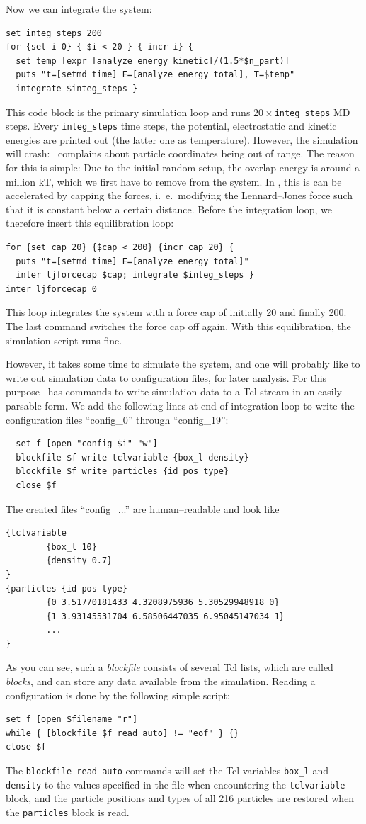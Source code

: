 Now we can integrate the system:
\begin{verbatim}
set integ_steps 200
for {set i 0} { $i < 20 } { incr i} {
  set temp [expr [analyze energy kinetic]/(1.5*$n_part)]
  puts "t=[setmd time] E=[analyze energy total], T=$temp"
  integrate $integ_steps }
\end{verbatim}
This code block is the primary simulation loop and runs
$20\times$\verb|integ_steps| MD steps. Every \verb|integ_steps| time steps, the
potential, electrostatic and kinetic energies are printed out (the latter one as
temperature). However, the simulation will crash: \es\ complains about particle
coordinates being out of range. The reason for this is simple: Due to the
initial random setup, the overlap energy is around a million kT, which we first
have to remove from the system. In \es, this is can be accelerated by capping
the forces, i.~e.\ modifying the Lennard--Jones force such that it is constant
below a certain distance. Before the integration loop, we therefore insert this
equilibration loop:
\begin{verbatim}
for {set cap 20} {$cap < 200} {incr cap 20} {
  puts "t=[setmd time] E=[analyze energy total]"
  inter ljforcecap $cap; integrate $integ_steps }
inter ljforcecap 0
\end{verbatim}
This loop integrates the system with a force cap of initially 20 and finally
200.  The last command switches the force cap off again. With this
equilibration, the simulation script runs fine.

However, it takes some time to simulate the system, and one will probably like
to write out simulation data to configuration files, for later analysis. For
this purpose \es\ has commands to write simulation data to a Tcl stream
in an easily parsable form.  We add the following lines at end of integration
loop to write the configuration files ``config\_0'' through ``config\_19'':
\begin{verbatim}
  set f [open "config_$i" "w"]
  blockfile $f write tclvariable {box_l density}
  blockfile $f write particles {id pos type}
  close $f
\end{verbatim}
The created files ``config\_...'' are human--readable and look like
{\footnotesize
\begin{verbatim}
{tclvariable
        {box_l 10}
        {density 0.7}
}
{particles {id pos type}
        {0 3.51770181433 4.3208975936 5.30529948918 0}
        {1 3.93145531704 6.58506447035 6.95045147034 1}
        ...
}
\end{verbatim}}
As you can see, such a \emph{blockfile} consists of several Tcl lists,
which are called \emph{blocks}, and can store any data available from the
simulation. Reading a configuration is done by the following simple script:
\begin{verbatim}
set f [open $filename "r"]
while { [blockfile $f read auto] != "eof" } {}
close $f
\end{verbatim}
The \verb|blockfile read auto| commands will set the Tcl variables \verb|box_l| and
\verb|density| to the values specified in the file when encountering the \verb|tclvariable| block,
and the particle positions and types of all 216 particles are restored when the \verb|particles|
block is read.

